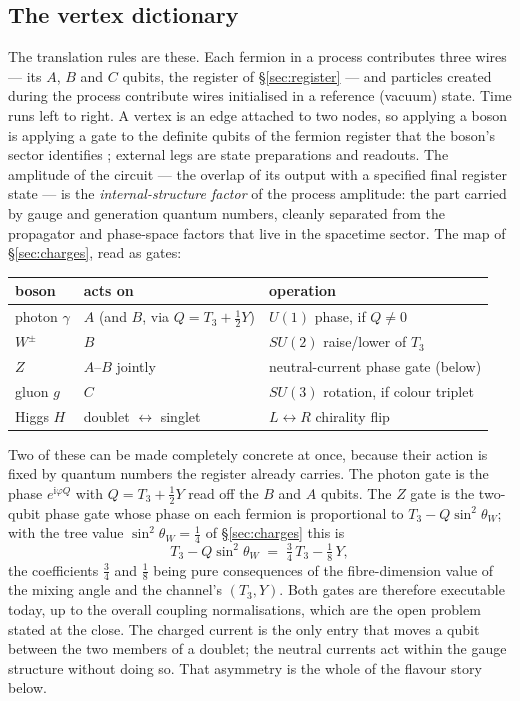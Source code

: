 \subsection{The vertex dictionary}

The translation rules are these. Each fermion in a process contributes three wires --- its $A$, $B$
and $C$ qubits, the register of \S\ref{sec:register} --- and particles created during the process
contribute wires initialised in a reference (vacuum) state. Time runs left to right. A vertex is an
edge attached to two nodes, so applying a boson is applying a gate to the definite qubits of the
fermion register that the boson's sector identifies
\autocite{coeckekissinger2010compositional}; external legs are state preparations and readouts. The
amplitude of the circuit --- the overlap of its output with a specified final register state --- is
the \emph{internal-structure factor} of the process amplitude: the part carried by gauge and
generation quantum numbers, cleanly separated from the propagator and phase-space factors that live
in the spacetime sector. The map of \S\ref{sec:charges}, read as gates:

\begin{center}
\begin{tabular}{lll}
\hline
boson & acts on & operation \\
\hline
photon $\gamma$ & $A$ (and $B$, via $Q=T_3+\tfrac12Y$) & $U(1)$ phase, if $Q\neq0$ \\
$W^\pm$         & $B$                                   & $SU(2)$ raise/lower of $T_3$ \\
$Z$             & $A$--$B$ jointly                      & neutral-current phase gate (below) \\
gluon $g$       & $C$                                   & $SU(3)$ rotation, if colour triplet \\
Higgs $H$       & doublet $\leftrightarrow$ singlet     & $L\leftrightarrow R$ chirality flip \\
\hline
\end{tabular}
\end{center}

Two of these can be made completely concrete at once, because their action is fixed by quantum
numbers the register already carries. The photon gate is the phase $e^{\mathrm{i}\varphi Q}$ with
$Q = T_3 + \tfrac12 Y$ read off the $B$ and $A$ qubits. The $Z$ gate is the two-qubit phase gate
whose phase on each fermion is proportional to $T_3 - Q\sin^2\theta_W$; with the tree value
$\sin^2\theta_W = \tfrac14$ of \S\ref{sec:charges} this is
\begin{equation}
  T_3 - Q\sin^2\theta_W \;=\; \tfrac34\,T_3 - \tfrac18\,Y,
  \label{eq:zphase}
\end{equation}
the coefficients $\tfrac34$ and $\tfrac18$ being pure consequences of the fibre-dimension value of
the mixing angle and the channel's $(T_3, Y)$. Both gates are therefore executable today, up to the
overall coupling normalisations, which are the open problem stated at the close. The charged current
is the only entry that moves a qubit between the two members of a doublet; the neutral currents act
within the gauge structure without doing so. That asymmetry is the whole of the flavour story below.

